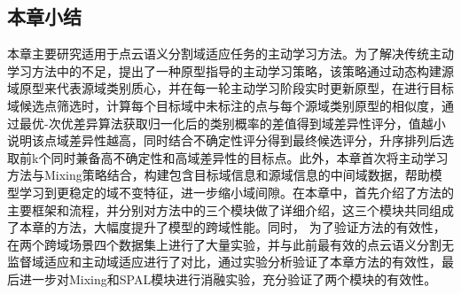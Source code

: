 \subsection{本章小结}
本章主要研究适用于点云语义分割域适应任务的主动学习方法。为了解决传统主动学习方法中的不足，提出了一种原型指导的主动学习策略，该策略通过动态构建源域原型来代表源域类别质心，并在每一轮主动学习阶段实时更新原型，在进行目标域候选点筛选时，计算每个目标域中未标注的点与每个源域类别原型的相似度，通过最优-次优差异算法获取归一化后的类别概率的差值得到域差异性评分，值越小说明该点域差异性越高，同时结合不确定性评分得到最终候选评分，升序排列后选取前k个同时兼备高不确定性和高域差异性的目标点。此外，本章首次将主动学习方法与Mixing策略结合，构建包含目标域信息和源域信息的中间域数据，帮助模型学习到更稳定的域不变特征，进一步缩小域间隙。在本章中，首先介绍了方法的主要框架和流程，并分别对方法中的三个模块做了详细介绍，这三个模块共同组成了本章的方法，大幅度提升了模型的跨域性能。同时， 为了验证方法的有效性，在两个跨域场景四个数据集上进行了大量实验，并与此前最有效的点云语义分割无监督域适应和主动域适应进行了对比，通过实验分析验证了本章方法的有效性，最后进一步对Mixing和SPAL模块进行消融实验，充分验证了两个模块的有效性。

